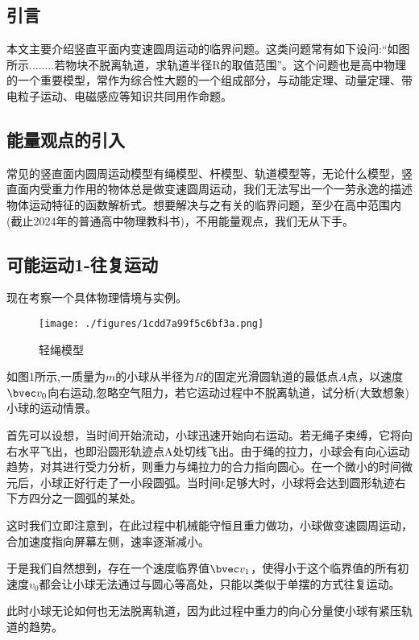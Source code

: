 

\subsection{引言}
本文主要介绍竖直平面内变速圆周运动的临界问题。这类问题常有如下设问:“如图所示........若物块不脱离轨道，求轨道半径R的取值范围”。这个问题也是高中物理的一个重要模型，常作为综合性大题的一个组成部分，与动能定理、动量定理、带电粒子运动、电磁感应等知识共同用作命题。

\subsection{能量观点的引入}
常见的竖直面内圆周运动模型有绳模型、杆模型、轨道模型等，无论什么模型，竖直面内受重力作用的物体总是做变速圆周运动，我们无法写出一个一劳永逸的描述物体运动特征的函数解析式。想要解决与之有关的临界问题，至少在高中范围内(截止2024年的普通高中物理教科书)，不用能量观点，我们无从下手。

\subsection{可能运动1-往复运动}
现在考察一个具体物理情境与实例。
\begin{figure}[ht]
\centering
\texttt{[image: ./figures/1cdd7a99f5c6bf3a.png]}
\caption{轻绳模型} \label{fig_CirVer_1}
\end{figure}
如图1所示,一质量为$m$的小球从半径为$R$的固定光滑圆轨道的最低点$A$点，以速度$\bvec v_0$向右运动,忽略空气阻力，若它运动过程中不脱离轨道，试分析(大致想象)小球的运动情景。

首先可以设想，当时间开始流动，小球迅速开始向右运动。若无绳子束缚，它将向右水平飞出，也即沿圆形轨迹点A处切线飞出。由于绳的拉力，小球会有向心运动趋势，对其进行受力分析，则重力与绳拉力的合力指向圆心。在一个微小的时间微元后，小球正好行走了一小段圆弧。当时间t足够大时，小球将会达到圆形轨迹右下方四分之一圆弧的某处。

这时我们立即注意到，在此过程中机械能守恒且重力做功，小球做变速圆周运动，合加速度指向屏幕左侧，速率逐渐减小。

于是我们自然想到，存在一个速度临界值$\bvec v_1$，使得小于这个临界值的所有初速度$v_0$都会让小球无法通过与圆心等高处，只能以类似于单摆的方式往复运动。

此时小球无论如何也无法脱离轨道，因为此过程中重力的向心分量使小球有紧压轨道的趋势。


